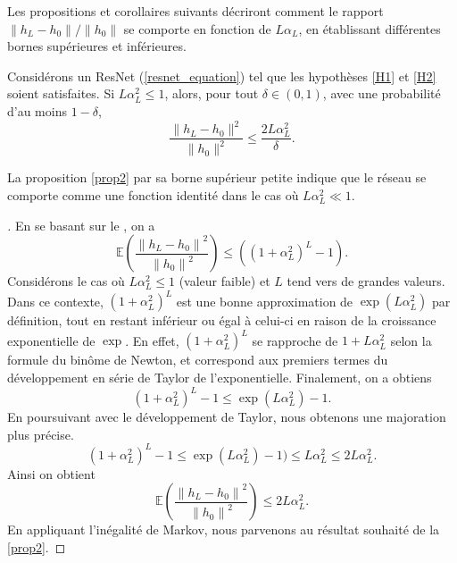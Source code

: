 Les propositions et corollaires suivants décriront comment le rapport ${\left\| h_L - h_0 \right\|} / {\left\| h_0 \right\|}$ se comporte en fonction de $L\alpha_L$, en établissant différentes bornes supérieures et inférieures.


\begin{proposition}\label{prop2}
    Considérons un ResNet (\ref{resnet_equation}) tel que les hypothèses \ref{H1} et \ref{H2} soient satisfaites.
    Si \( L\alpha_L^2 \leqslant 1 \), alors, pour tout \( \delta \in (0, 1) \), avec une probabilité d'au moins \( 1 - \delta \),
    \[
        \frac{\|h_L - h_0\|^2}{\|h_0\|^2} \leqslant \frac{2L\alpha_L^2}{\delta}
    .\]
\end{proposition}
La proposition \ref{prop2} par sa borne supérieur petite indique que le réseau se comporte comme une fonction identité dans le cas où $ L \alpha ^2 _L \ll 1 $.

\begin{proof}[]
    En se basant sur le , on a 
    \[
        \mathbb{E}( \frac{\left\| h_L - h_0 \right\| ^2 }{\left\| h_0 \right\| ^2}) \leqslant ((1 + \alpha _L ^2 ) ^L - 1 )
    .\]
    Considérons le cas où $L \alpha_L^2 \leqslant 1$ (valeur faible) et $L$ tend vers de grandes valeurs. Dans ce contexte, $(1 + \alpha_L^2)^L$ est une bonne approximation de $\exp(L \alpha_L^2)$ par définition, tout en restant inférieur ou égal à celui-ci en raison de la croissance exponentielle de $\exp$. En effet, $(1 + \alpha_L^2)^L$ se rapproche de $1 + L \alpha_L^2$ selon la formule du binôme de Newton, et correspond aux premiers termes du développement en série de Taylor de l'exponentielle. Finalement, on a obtiens
    \[
        (1 + \alpha _L ^2)^L -1 \leqslant \exp (L \alpha _L ^2) - 1
    .\]
    En poursuivant avec le développement de Taylor, nous obtenons une majoration plus précise.
    \[
        (1 + \alpha _L ^2)^L -1 \leqslant \exp (L \alpha _L ^2) - 1) \leqslant L \alpha _L ^2 \leqslant 2 L \alpha _L ^2
    .\]
    Ainsi on obtient 
    \[
        \mathbb{E}( \frac{\left\| h_L - h_0 \right\| ^2 }{\left\| h_0 \right\| ^2}) \leqslant 2 L \alpha _L ^2
    .\]
    En appliquant l'inégalité de Markov, nous parvenons au résultat souhaité de la \cref{prop2}.
\end{proof}



